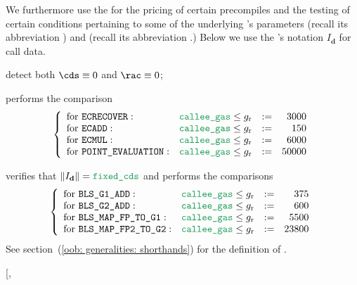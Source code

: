 We furthermore use the \oobMod{} for the pricing of certain precompiles and the testing of certain conditions pertaining to some of the underlying 's parameters
\CDS{} (recall its abbreviation \cds{}) and
\RAC{} (recall its abbreviation \rac{}.)
\saNote{} Below we use the \cite{EYP-London}'s notation $I_\textbf{d}$ for call data.
\begin{description}
	\item[\underline{\instEcrecover{},
		\instShaTwo{},
		\instRipemd{},
		\instIdentity{},
		\instEcadd{},
		\instEcmul{},
		\instEcpairing{},
		\instPointEvaluation{},
		\instBlsGOneAdd{},
		\instBlsGTwoAdd{},
		\instBlsMapFpToGOne{},
		\instBlsMapFpTwoToGTwo{}:}]
		detect both $\cds \equiv 0$ and $\rac \equiv 0$; 
	\item[\underline{\instEcrecover{},
		\instEcadd{},
		\instEcmul{} and
		\instPointEvaluation{} pricing:}]
		performs the comparison
		\[
			\left\{ \begin{array}{llcrcl}
				\text{for }\instEcrecover{}       : & \locCalleeGas \leq g_\text{r} & := &  3000 \\
				\text{for }\instEcadd{}           : & \locCalleeGas \leq g_\text{r} & := &   150 \\
				\text{for }\instEcmul{}           : & \locCalleeGas \leq g_\text{r} & := &  6000 \\
				\text{for }\instPointEvaluation{} : & \locCalleeGas \leq g_\text{r} & := & 50000 \\
			\end{array} \right.
		\]
	\item[\underline{\instBlsGOneAdd{},
		\instBlsGTwoAdd{},
		\instBlsMapFpToGOne{}, and
		\instBlsMapFpTwoToGTwo{}:}]
		verifies that $\| I_\textbf{d} \| = \locFixedCds$ and performs the comparisons
		\[
			\left\{ \begin{array}{llcrcl}
				\text{for }\instBlsGOneAdd{}        : & \locCalleeGas \leq g_\text{r} & := &   375 \\
				\text{for }\instBlsGTwoAdd{}        : & \locCalleeGas \leq g_\text{r} & := &   600 \\
				\text{for }\instBlsMapFpToGOne{}    : & \locCalleeGas \leq g_\text{r} & := &  5500 \\
				\text{for }\instBlsMapFpTwoToGTwo{} : & \locCalleeGas \leq g_\text{r} & := & 23800 \\
			\end{array} \right.
		\]
		See section~(\ref{oob: generalities: shorthands}) for the definition of \locFixedCds{}.	
	\item[\underline{\instShaTwo{},
}
\end{description}
